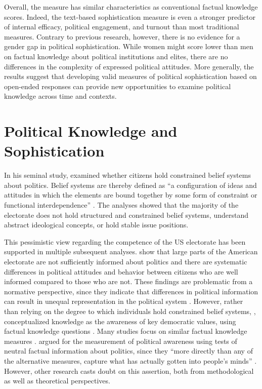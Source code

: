 \documentclass[12pt]{article}
\begin{document}
Overall, the measure has similar characteristics as conventional factual knowledge scores. Indeed, the text-based sophistication measure is even a stronger predictor of internal efficacy, political engagement, and turnout than most traditional measures. Contrary to previous research, however, there is no evidence for a gender gap in political sophistication. While women might score lower than men on factual knowledge about political institutions and elites, there are no differences in the complexity of expressed political attitudes. More generally, the results suggest that developing valid measures of political sophistication based on open-ended responses can provide new opportunities to examine political knowledge across time and contexts. 


\section*{Political Knowledge and Sophistication}

In his seminal study, \citet{converse1964nature} examined whether citizens hold constrained belief systems about politics. Belief systems are thereby defined as ``a configuration of ideas and attitudes in which the elements are bound together by some form of constraint or functional interdependence'' \citep[207]{converse1964nature}. The analyses showed that the majority of the electorate does not hold structured and constrained belief systems, understand abstract ideological concepts, or hold stable issue positions. 

This pessimistic view regarding the competence of the US electorate has been supported in multiple subsequent analyses. \citet{carpini1996americans} show that large parts of the American electorate are not sufficiently informed about politics and there are systematic differences in political attitudes and behavior between citizens who are well informed compared to those who are not. These findings are problematic from a normative perspective, since they indicate that differences in political information can result in unequal representation in the political system \citep[see also][]{althaus1998information,kuklinski2000misinformation,gilens2001political}. However, rather than relying on the degree to which individuals hold constrained belief systems, \citet{carpini1996americans}, conceptualized knowledge as the awareness of key democratic values, using factual knowledge questions \citep[see also][]{carpini1993measuring}. Many studies focus on similar factual knowledge measures \citep[e.g.][]{zaller1991information,jacoby1995structure,gomez2001political}.  \citet{zaller1992nature} argued for the measurement of political awareness using tests of neutral factual information about politics, since they ``more directly than any of the alternative measures, capture what has actually gotten into people’s minds'' \citep[21]{zaller1992nature}. However, other research casts doubt on this assertion, both from methodological as well as theoretical perspectives.
\end{document}
